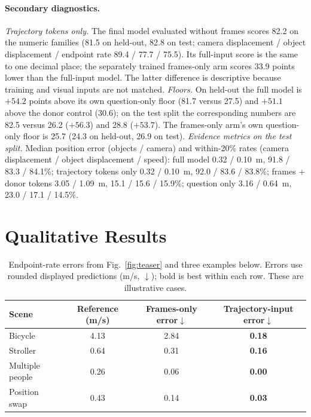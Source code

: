 \paragraph{Secondary diagnostics.}
\emph{Trajectory tokens only.} The final model evaluated without frames scores 82.2 on the numeric families (81.5 on held-out, 82.8 on test; camera displacement / object displacement / endpoint rate 89.4 / 77.7 / 75.5). Its full-input score is the same to one decimal place; the separately trained frames-only arm scores 33.9 points lower than the full-input model. The latter difference is descriptive because training and visual inputs are not matched.
\emph{Floors.} On held-out the full model is $+54.2$ points above its own question-only floor (81.7 versus 27.5) and $+51.1$ above the donor control (30.6); on the test split the corresponding numbers are 82.5 versus 26.2 ($+56.3$) and 28.8 ($+53.7$). The frames-only arm's own question-only floor is 25.7 (24.3 on held-out, 26.9 on test).
\emph{Evidence metrics on the test split.} Median position error (objects / camera) and within-20\% rates (camera displacement / object displacement / speed): full model 0.32 / 0.10~m, 91.8 / 83.3 / 84.1\%; trajectory tokens only 0.32 / 0.10~m, 92.0 / 83.6 / 83.8\%; frames + donor tokens 3.05 / 1.09~m, 15.1 / 15.6 / 15.9\%; question only 3.16 / 0.64~m, 23.0 / 17.1 / 14.5\%.

\section{Qualitative Results}
\label{app:qualitative}

\begin{table}[t]
\caption{Endpoint-rate errors from Fig.~\ref{fig:teaser} and three examples below. Errors use rounded displayed predictions (m/s, $\downarrow$); bold is best within each row. These are illustrative cases.}
\label{tab:cases}
\begin{center}
\small
\setlength{\tabcolsep}{8pt}
\begin{tabular}{lccc}
\toprule
\textbf{Scene} & \textbf{Reference (m/s)} & \textbf{Frames-only error}$\downarrow$ & \textbf{Trajectory-input error}$\downarrow$ \\
\midrule
Bicycle & 4.13 & 2.84 & \textbf{0.18} \\
Stroller & 0.64 & 0.31 & \textbf{0.16} \\
Multiple people & 0.26 & 0.06 & \textbf{0.00} \\
Position swap & 0.43 & 0.14 & \textbf{0.03} \\
\bottomrule
\end{tabular}
\end{center}
\end{table}

